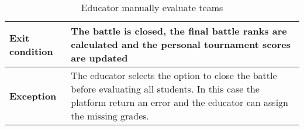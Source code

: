 \begin{enumerate}[label=\textbf{UC\arabic*}:,ref=UC\arabic*,leftmargin=1.3cm]
{\begin{table}[H]
\begin{tabular}{|l|p{11.9cm}|}
                        \textbf{Exit condition}  & The battle is closed, the final battle ranks are calculated and the personal tournament scores are updated \\\hline
                        \textbf{Exception}       & The educator selects the option to close the battle before evaluating all students.
                        In this case the platform return an error and the educator can assign the missing grades.                                             \\\hline
                  \end{tabular}
                  \caption{Educator manually evaluate teams    }
                  \label{table:Educator manually evaluate teams    }
            \end{table}
            \begin{adjustbox}{
                        max size={\textwidth}{},
                        caption={Educator manually evaluate teams},
                        label={fig:Educator manually evaluate teams},
                        figure=H}
                  \centering
            \end{adjustbox}
            \pagebreak
      }
\end{enumerate}
